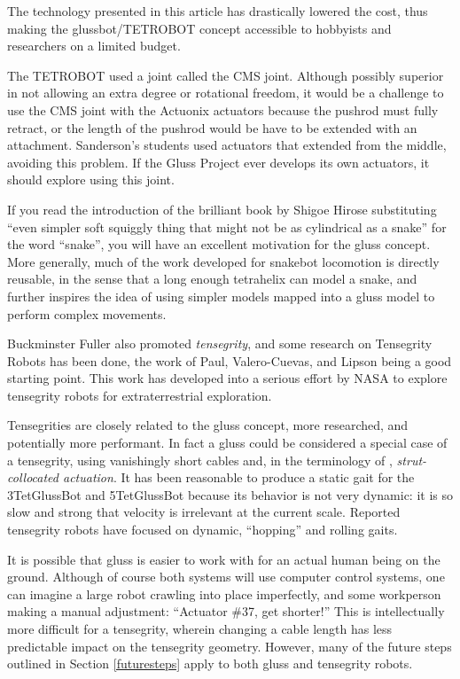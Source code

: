 \documentclass[11pt]{article}
\begin{document}
The technology presented in this article has drastically lowered the cost,
thus making the glussbot/TETROBOT concept
accessible to hobbyists and researchers on a limited budget.

The TETROBOT used a joint called the CMS joint. Although
possibly superior in not allowing an extra degree or rotational freedom, it would be a challenge to use the CMS
joint with the Actuonix actuators because the pushrod must fully retract, or the length of the pushrod would be
have to be extended with an attachment. Sanderson's students used actuators that
extended from the middle, avoiding this problem. If the Gluss Project ever develops its own actuators, it should
explore using this joint.

If you read the introduction of the brilliant book by Shigoe Hirose\cite{hirose1993biologically} substituting
``even simpler soft squiggly thing that might not be as cylindrical as a snake'' for the word ``snake'', you will have
an excellent motivation for the gluss concept.  More generally, much of the work developed for snakebot
locomotion\cite{liljebäck2012snake} is directly reusable, in the sense that a long enough tetrahelix can
model a snake, and further inspires the idea of using simpler models mapped into a gluss model to perform
complex movements.

Buckminster Fuller also promoted \emph{tensegrity}, and some research on Tensegrity Robots has been done, the
work of Paul, Valero-Cuevas, and Lipson\cite{paul2006} being a good starting point.
This work has developed into a serious effort\cite{NTRT} by NASA to explore tensegrity robots for extraterrestrial
exploration.

Tensegrities are closely related to the gluss concept, more researched, and potentially more performant.
In fact a gluss could be considered a special case of a tensegrity, using vanishingly short cables
and, in the terminology of \cite{paul2006}, \emph{strut-collocated actuation}.
It has been reasonable to produce a static gait for the 3TetGlussBot and 5TetGlussBot because its behavior is not
very dynamic: it is so slow and strong that velocity is irrelevant at the current scale.
Reported tensegrity robots have focused on dynamic, ``hopping'' and rolling gaits.

It is possible that gluss is easier to work with for an actual human being on the ground.
Although of course both systems will use computer control systems, one can imagine a large robot
crawling into place imperfectly, and some workperson making a manual adjustment: ``Actuator \#37, get shorter!''
This is intellectually more difficult for a tensegrity, wherein changing a cable length
has less predictable impact on the tensegrity geometry.
However, many
of the future steps outlined in Section \ref{futuresteps} apply to both gluss and tensegrity robots.
\end{document}
